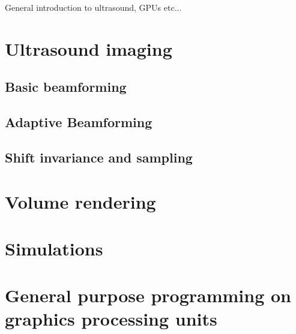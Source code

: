 %

General introduction to ultrasound, GPUs etc...


\section {Ultrasound imaging}
							
\subsection{Basic beamforming}

\subsection{Adaptive Beamforming}
						
\subsection{Shift invariance and sampling}

\section{Volume rendering}

\section{Simulations}

\section{General purpose programming on graphics processing units}
			
\endinput
